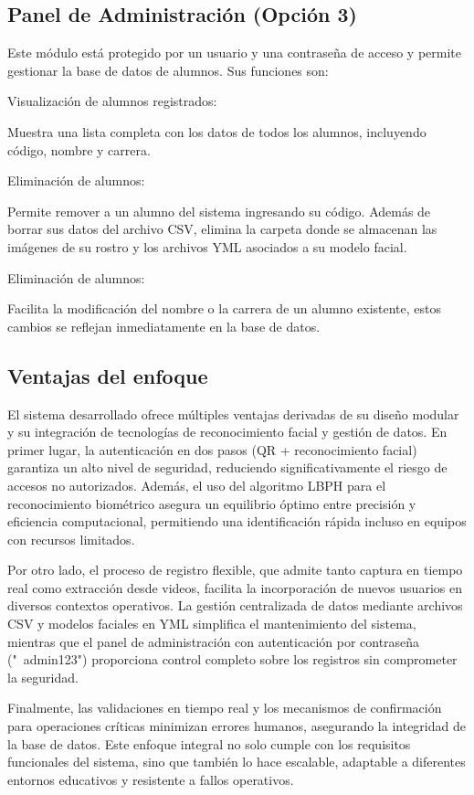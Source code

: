 \documentclass[12pt]{article}
\begin{document}
{\subsection{Panel de Administración (Opción 3)}
Este módulo está protegido por un usuario y una contraseña de acceso y permite gestionar la base de datos de alumnos. Sus funciones son:
\begin{itemize}
	{\bfseries\item Visualización de alumnos registrados:} Muestra una lista completa con los datos de todos los alumnos, incluyendo código, nombre y carrera.
	{\bfseries\item Eliminación de alumnos:} Permite remover a un alumno del sistema ingresando su código. Además de borrar sus datos del archivo CSV, elimina la carpeta donde se almacenan las imágenes de su rostro y los archivos YML asociados a su modelo facial.
    {\bfseries\item Eliminación de alumnos:} Facilita la modificación del nombre o la carrera de un alumno existente, estos cambios se reflejan inmediatamente en la base de datos.
\end{itemize}

\subsection{Ventajas del enfoque}
El sistema desarrollado ofrece múltiples ventajas derivadas de su diseño modular y su integración de tecnologías de reconocimiento facial y gestión de datos. En primer lugar, la autenticación en dos pasos (QR + reconocimiento facial) garantiza un alto nivel de seguridad, reduciendo significativamente el riesgo de accesos no autorizados. Además, el uso del algoritmo LBPH para el reconocimiento biométrico asegura un equilibrio óptimo entre precisión y eficiencia computacional, permitiendo una identificación rápida incluso en equipos con recursos limitados.

Por otro lado, el proceso de registro flexible, que admite tanto captura en tiempo real como extracción desde videos, facilita la incorporación de nuevos usuarios en diversos contextos operativos. La gestión centralizada de datos mediante archivos CSV y modelos faciales en YML simplifica el mantenimiento del sistema, mientras que el panel de administración con autenticación por contraseña ("\ admin123") proporciona control completo sobre los registros sin comprometer la seguridad.

Finalmente, las validaciones en tiempo real y los mecanismos de confirmación para operaciones críticas minimizan errores humanos, asegurando la integridad de la base de datos. Este enfoque integral no solo cumple con los requisitos funcionales del sistema, sino que también lo hace escalable, adaptable a diferentes entornos educativos y resistente a fallos operativos.

}
\end{document}

